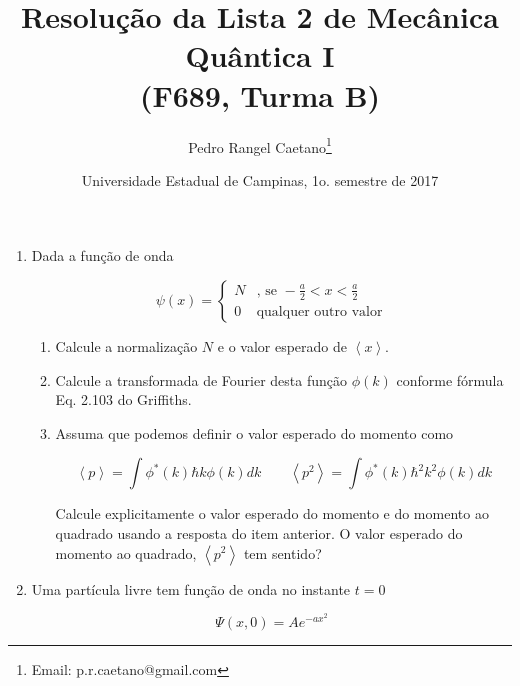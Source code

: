 \documentclass[a4paper, 12pt, notitlepage]{article}
\begin{document}
\title{Resolução da Lista 2 de Mecânica Quântica I\\ (F689, Turma B)}
\author{Pedro Rangel Caetano\footnote{Email: p.r.caetano@gmail.com}} 
\date{Universidade Estadual de Campinas, 1o. semestre de 2017}
\maketitle

\tableofcontents
\pagebreak

\begin{enumerate}

\item Dada a função de onda  

\begin{equation*}
  \psi(x) = \begin{cases}N &\text{, se }-\frac{a}{2} < x < \frac{a}{2} \\
  0&\text{qualquer outro valor} \end{cases}
\end{equation*}

\begin{enumerate}
  \item Calcule a normalização $N$ e o valor esperado de $\left\langle x \right\rangle$.
  \item Calcule a transformada de Fourier desta função $\phi(k)$ conforme fórmula Eq. 2.103 do Griffiths.
  \item Assuma que podemos definir o valor esperado do momento como
  
  \begin{equation*}
    \left\langle p \right\rangle = \int \phi^{\ast}(k)\hbar k \phi(k) dk \qquad \left\langle p^2 \right\rangle = \int \phi^{\ast}(k) \hbar^2 k^2 \phi(k) dk
  \end{equation*}
  
  Calcule explicitamente o valor esperado do momento e do momento ao quadrado usando a resposta do item anterior. O valor esperado do momento ao quadrado, $\left\langle p^2 \right\rangle$ tem sentido?
\end{enumerate}

\item Uma partícula livre tem função de onda no instante $t=0$

  \begin{equation*}
  \Psi(x, 0) = Ae^{-ax^2}
  \end{equation*}
  

\end{enumerate}
\end{document}
